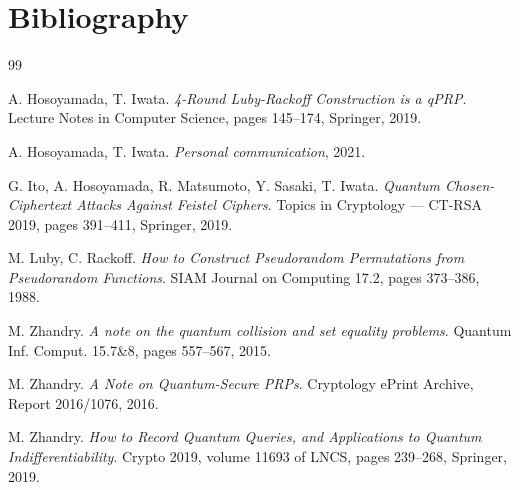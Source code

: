\documentclass{aicr-conjecture}
\begin{document}
\section{Bibliography}

\begin{aicrbibliography}{99}

A. Hosoyamada, T. Iwata.
\emph{4-Round Luby-Rackoff Construction is a qPRP}.
Lecture Notes in Computer Science, pages 145--174, Springer, 2019.

A. Hosoyamada, T. Iwata.
\emph{Personal communication}, 2021.

G. Ito, A. Hosoyamada, R. Matsumoto, Y. Sasaki, T. Iwata.
\emph{Quantum Chosen-Ciphertext Attacks Against Feistel Ciphers}.
Topics in Cryptology --- CT-RSA 2019, pages 391--411, Springer, 2019.

M. Luby, C. Rackoff.
\emph{How to Construct Pseudorandom Permutations from Pseudorandom
Functions}.
SIAM Journal on Computing 17.2, pages 373--386, 1988.

M. Zhandry.
\emph{A note on the quantum collision and set equality problems}.
Quantum Inf. Comput. 15.7\&8, pages 557--567, 2015.

M. Zhandry.
\emph{A Note on Quantum-Secure PRPs}.
Cryptology ePrint Archive, Report 2016/1076, 2016.

M. Zhandry.
\emph{How to Record Quantum Queries, and Applications to Quantum
Indifferentiability}.
Crypto 2019, volume 11693 of LNCS, pages 239--268, Springer, 2019.

\end{aicrbibliography}
\end{document}
